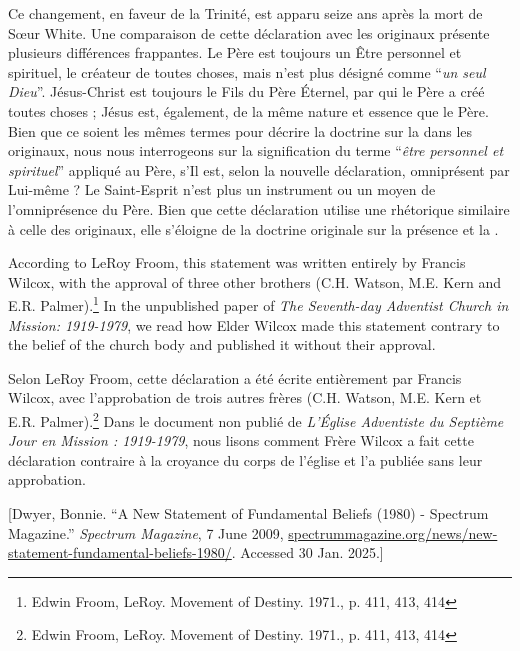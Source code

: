 Ce changement, en faveur de la Trinité, est apparu seize ans après la mort de Sœur White. Une comparaison de cette déclaration avec les  originaux présente plusieurs différences frappantes. Le Père est toujours un Être personnel et spirituel, le créateur de toutes choses, mais n'est plus désigné comme “\textit{un seul Dieu}”. Jésus-Christ est toujours le Fils du Père Éternel, par qui le Père a créé toutes choses ; Jésus est, également, de la même nature et essence que le Père. Bien que ce soient les mêmes termes pour décrire la doctrine sur la  dans les  originaux, nous nous interrogeons sur la signification du terme “\textit{être personnel et spirituel}” appliqué au Père, s'Il est, selon la nouvelle déclaration, omniprésent par Lui-même ? Le Saint-Esprit n'est plus un instrument ou un moyen de l'omniprésence du Père. Bien que cette déclaration utilise une rhétorique similaire à celle des  originaux, elle s'éloigne de la doctrine originale sur la présence et la .


According to LeRoy Froom, this statement was written entirely by Francis Wilcox, with the approval of three other brothers (C.H. Watson, M.E. Kern and E.R. Palmer).\footnote{Edwin Froom, LeRoy. Movement of Destiny. 1971., p. 411, 413, 414} In the unpublished paper of \textit{The Seventh-day Adventist Church in Mission: 1919-1979}, we read how Elder Wilcox made this statement contrary to the belief of the church body and published it without their approval.


Selon LeRoy Froom, cette déclaration a été écrite entièrement par Francis Wilcox, avec l'approbation de trois autres frères (C.H. Watson, M.E. Kern et E.R. Palmer).\footnote{Edwin Froom, LeRoy. Movement of Destiny. 1971., p. 411, 413, 414} Dans le document non publié de \textit{L'Église Adventiste du Septième Jour en Mission : 1919-1979}, nous lisons comment Frère Wilcox a fait cette déclaration contraire à la croyance du corps de l'église et l'a publiée sans leur approbation.


[Dwyer, Bonnie. “A New Statement of Fundamental Beliefs (1980) - Spectrum Magazine.” \textit{Spectrum Magazine}, 7 June 2009, \href{https://spectrummagazine.org/news/new-statement-fundamental-beliefs-1980/}{spectrummagazine.org/news/new-statement-fundamental-beliefs-1980/}. Accessed 30 Jan. 2025.]


